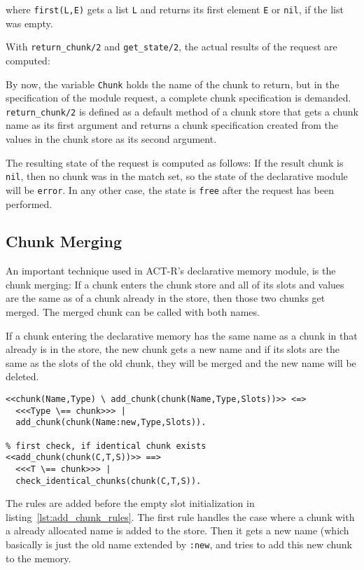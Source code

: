 where \verb|first(L,E)| gets a list \verb|L| and returns its first element \verb|E| or \verb|nil|, if the list was empty.

With \verb|return_chunk/2| and \verb|get_state/2|, the actual results of the request are computed:

By now, the variable \verb|Chunk| holds the name of the chunk to return, but in the specification of the module request, a complete chunk specification is demanded. \verb|return_chunk/2| is defined as a default method of a chunk store that gets a chunk name as its first argument and returns a chunk specification created from the values in the chunk store as its second argument.

The resulting state of the request is computed as follows: If the result chunk is \verb|nil|, then no chunk was in the match set, so the state of the declarative module will be \verb|error|. In any other case, the state is \verb|free| after the request has been performed.

\subsection{Chunk Merging}

An important technique used in ACT-R's declarative memory module, is the chunk merging: If a chunk enters the chunk store and all of its slots and values are the same as of a chunk already in the store, then those two chunks get merged. The merged chunk can be called with both names.

If a chunk entering the declarative memory has the same name as a chunk in that already is in the store, the new chunk gets a new name and if its slots are the same as the slots of the old chunk, they will be merged and the new name will be deleted.

\begin{lstlisting}
<<chunk(Name,Type) \ add_chunk(chunk(Name,Type,Slots))>> <=>
  <<<Type \== chunk>>> |
  add_chunk(chunk(Name:new,Type,Slots)).

% first check, if identical chunk exists
<<add_chunk(chunk(C,T,S))>> ==> 
  <<<T \== chunk>>> | 
  check_identical_chunks(chunk(C,T,S)).
\end{lstlisting}

The rules are added before the empty slot initialization in listing~\ref{lst:add_chunk_rules}. The first rule handles the case where a chunk with a already allocated name is added to the store. Then it gets a new name (which basically is just the old name extended by \verb|:new|, and tries to add this new chunk to the memory. 

